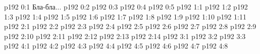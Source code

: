 \author{Промежуточные создания}
\vs p192 0:1  Бла-бла...
\vs p192 0:2 
\vs p192 0:3 
\vs p192 0:4 
\vs p192 0:5 
\vs p192 1:1 
\vs p192 1:2 
\vs p192 1:3 
\vs p192 1:4 
\vs p192 1:5 
\vs p192 1:6 
\vs p192 1:7 
\vs p192 1:8 
\vs p192 1:9 \pc 
\vs p192 1:10 \pc 
\vs p192 1:11 
\vs p192 2:1 
\vs p192 2:2 
\vs p192 2:3 
\vs p192 2:4 
\vs p192 2:5 
\vs p192 2:6 \pc 
\vs p192 2:7 \pc 
\vs p192 2:8 
\vs p192 2:9 \pc 
\vs p192 2:10 
\vs p192 2:11 \pc 
\vs p192 2:12 
\vs p192 2:13 \pc 
\vs p192 2:14 \pc 
{}
\vs p192 3:1 
\vs p192 3:2 
\vs p192 3:3 \pc 
{}
\vs p192 4:1 
\vs p192 4:2 
\vs p192 4:3 
\vs p192 4:4 \pc 
\vs p192 4:5 \pc 
\vs p192 4:6 \pc 
\vs p192 4:7 
\vs p192 4:8 
\quizlink
